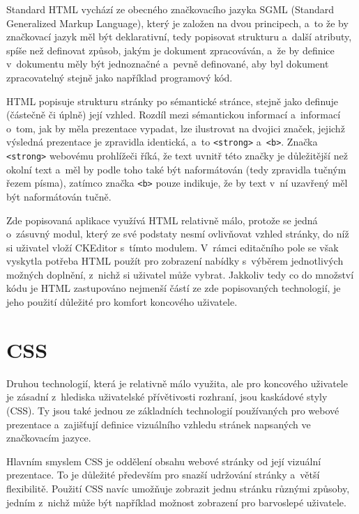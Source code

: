 \documentclass[a4paper,11pt,openany]{book} %
\begin{document}
Standard HTML vychází ze obecného značkovacího jazyka SGML (Standard Generalized Markup Language), který je založen na dvou principech, a~to že by značkovací jazyk měl být deklarativní, tedy popisovat strukturu a~další atributy, spíše než definovat způsob, jakým je dokument zpracováván, a~že by definice v~dokumentu měly být jednoznačné a~pevně definované, aby byl dokument zpracovatelný stejně jako například programový kód. \parencite{rubinsky1990sgml} %


HTML popisuje strukturu stránky po sémantické stránce, stejně jako definuje (částečně či úplně) její vzhled. Rozdíl mezi sémantickou informací a~informací o~tom, jak by měla prezentace vypadat, lze ilustrovat na dvojici značek, jejichž výsledná prezentace je zpravidla identická, a~to {\tt <strong>} a~{\tt <b>}. Značka {\tt <strong>} webovému prohlížeči říká, že text uvnitř této značky je důležitější než okolní text a~měl by podle toho také být naformátován (tedy zpravidla tučným řezem písma), zatímco značka {\tt <b>} pouze indikuje, že by text v~ní uzavřený měl být naformátován tučně. %


Zde popisovaná aplikace využívá HTML relativně málo, protože se jedná o~zásuvný modul, který ze své podstaty nesmí ovlivňovat vzhled stránky, do níž si uživatel vloží CKEditor s~tímto modulem. V~rámci editačního pole se však vyskytla potřeba HTML použít pro zobrazení nabídky s~výběrem jednotlivých možných doplnění, z~nichž si uživatel může vybrat. Jakkoliv tedy co do množství kódu je HTML zastupováno nejmenší částí ze zde popisovaných technologií, je jeho použití důležité pro komfort koncového uživatele.

\section{CSS}

Druhou technologií, která je relativně málo využita, ale pro koncového uživatele je zásadní z~hlediska uživatelské přívětivosti rozhraní, jsou kaskádové styly (CSS). Ty jsou také jednou ze základních technologií používaných pro webové prezentace a~zajišťují definice vizuálního vzhledu stránek napsaných ve značkovacím jazyce. \parencite{meyer2004cascading}

Hlavním smyslem CSS je oddělení obsahu webové stránky od její vizuální prezentace. To je důležité především pro snazší udržování stránky a~větší flexibilitě. Použití CSS navíc umožňuje zobrazit jednu stránku různými způsoby, jedním z~nichž může být například možnost zobrazení pro barvoslepé uživatele.
\end{document}
